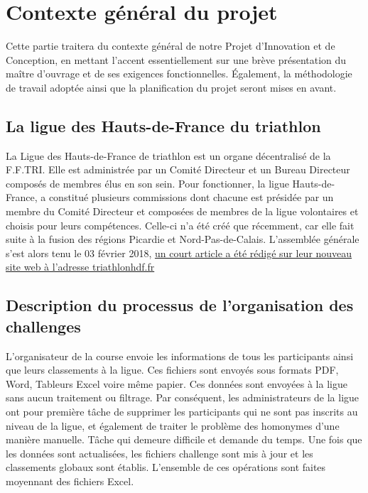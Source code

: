 \section {Contexte général du projet}
	
	Cette partie traitera du contexte général de notre Projet d’Innovation et de Conception, en mettant l’accent essentiellement sur une brève présentation du maître d'ouvrage et de ses exigences fonctionnelles. Également, la méthodologie de travail adoptée ainsi que la planification du projet seront mises en avant.  
	
	\subsection{La ligue des Hauts-de-France du triathlon }
	
	La Ligue des Hauts-de-France de triathlon est un organe décentralisé de la F.F.TRI. Elle est administrée par un Comité Directeur et un Bureau Directeur composés de membres élus en son sein. 
	Pour fonctionner, la ligue Hauts-de-France, a constitué plusieurs commissions dont chacune est présidée par un membre du Comité Directeur et composées de membres de la ligue volontaires et choisis pour leurs compétences.
	Celle-ci n'a été créé que récemment, car elle fait suite à la fusion des régions Picardie et Nord-Pas-de-Calais.
	L'assemblée générale s'est alors tenu le 03 février 2018, \href{http://triathlonhdf.fr/samedi-03-fevrier-2018-la-ligue-des-hauts-de-france-de-triathlon-est-creee/}{un court article a été rédigé sur leur nouveau site web à l'adresse triathlonhdf.fr} \cite{ref1}
	
	\subsection{Description du processus de l’organisation des challenges }
	L’organisateur de la course envoie les informations de tous les participants ainsi que leurs classements à la ligue. Ces fichiers sont envoyés sous formats PDF, Word, Tableurs Excel voire même papier.  Ces données sont envoyées à la ligue sans aucun traitement ou filtrage. Par conséquent, les administrateurs de la ligue ont pour première tâche de supprimer les participants qui ne sont pas inscrits au niveau de la ligue, et également de traiter le problème des homonymes d’une manière manuelle. Tâche qui demeure difficile et demande du temps.
	Une fois que les données sont actualisées, les fichiers challenge sont mis à jour et les classements globaux sont établis. L’ensemble de ces opérations sont faites moyennant des fichiers Excel.
	
